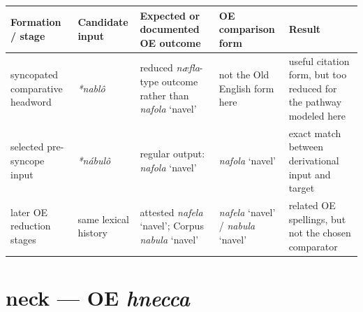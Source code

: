 \documentclass[
  british,
  a4paper,
  openany]{book}
\newcounter{none} %
\providecommand{\texorpdfstring}[2]{#1}
\begin{document}
{\def\LTcaptype{none} %
\begin{longtable}[]{@{}
  >{\raggedright\arraybackslash}p{}
  >{\raggedright\arraybackslash}p{}
  >{\raggedright\arraybackslash}p{}
  >{\raggedright\arraybackslash}p{}
  >{\raggedright\arraybackslash}p{}@{}}
\toprule\noalign{}
\begin{minipage}[b]{\linewidth}\raggedright
Formation / stage
\end{minipage} & \begin{minipage}[b]{\linewidth}\raggedright
Candidate input
\end{minipage} & \begin{minipage}[b]{\linewidth}\raggedright
Expected or documented OE outcome
\end{minipage} & \begin{minipage}[b]{\linewidth}\raggedright
OE comparison form
\end{minipage} & \begin{minipage}[b]{\linewidth}\raggedright
Result
\end{minipage} \\
\midrule\noalign{}
\endhead
\bottomrule\noalign{}
\endlastfoot
syncopated comparative headword & {\emph{*nablô}} & reduced
\emph{næfla}-type outcome rather than {\emph{nafola}} `navel' & not the
Old English form here & useful citation form, but too reduced for the
pathway modeled here \\
selected pre-syncope input & {\emph{*nábulô}} & regular output:
{\emph{nafola}} `navel' & {\emph{nafola}} `navel' & exact match between
derivational input and target \\
later OE reduction stages & same lexical history & attested
{\emph{nafela}} `navel'; Corpus {\emph{nabula}} `navel' &
{\emph{nafela}} `navel' / {\emph{nabula}} `navel' & related OE
spellings, but not the chosen comparator \\
\end{longtable}
}

\section{\texorpdfstring{neck --- OE
\emph{hnecca}}{neck --- OE hnecca}}\label{neck-oe-hnecca}

\end{document}

